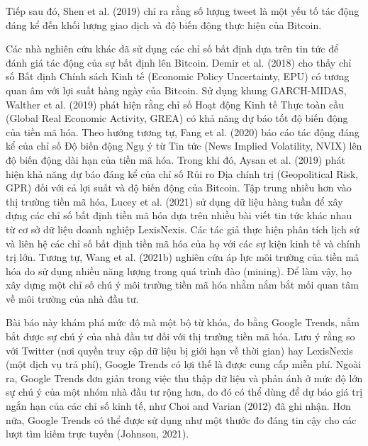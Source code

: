 Tiếp sau đó, Shen et al. (2019) chỉ ra rằng số lượng tweet là một yếu tố tác động đáng kể đến khối lượng giao dịch và độ biến động thực hiện của Bitcoin.

Các nhà nghiên cứu khác đã sử dụng các chỉ số bất định dựa trên tin tức để đánh giá tác động của sự bất định lên Bitcoin. Demir et al. (2018) cho thấy chỉ số Bất định Chính sách Kinh tế (Economic Policy Uncertainty, EPU) có tương quan âm với lợi suất hàng ngày của Bitcoin. Sử dụng khung GARCH-MIDAS, Walther et al. (2019) phát hiện rằng chỉ số Hoạt động Kinh tế Thực toàn cầu (Global Real Economic Activity, GREA) có khả năng dự báo tốt độ biến động của tiền mã hóa. Theo hướng tương tự, Fang et al. (2020) báo cáo tác động đáng kể của chỉ số Độ biến động Ngụ ý từ Tin tức (News Implied Volatility, NVIX) lên độ biến động dài hạn của tiền mã hóa. Trong khi đó, Aysan et al. (2019) phát hiện khả năng dự báo đáng kể của chỉ số Rủi ro Địa chính trị (Geopolitical Risk, GPR) đối với cả lợi suất và độ biến động của Bitcoin. Tập trung nhiều hơn vào thị trường tiền mã hóa, Lucey et al. (2021) sử dụng dữ liệu hàng tuần để xây dựng các chỉ số bất định tiền mã hóa dựa trên nhiều bài viết tin tức khác nhau từ cơ sở dữ liệu doanh nghiệp LexisNexis. Các tác giả thực hiện phân tích lịch sử và liên hệ các chỉ số bất định tiền mã hóa của họ với các sự kiện kinh tế và chính trị lớn. Tương tự, Wang et al. (2021b) nghiên cứu áp lực môi trường của tiền mã hóa do sử dụng nhiều năng lượng trong quá trình đào (mining). Để làm vậy, họ xây dựng một chỉ số chú ý môi trường tiền mã hóa nhằm nắm bắt mối quan tâm về môi trường của nhà đầu tư.

Bài báo này khám phá mức độ mà một bộ từ khóa, đo bằng Google Trends, nắm bắt được sự chú ý của nhà đầu tư đối với thị trường tiền mã hóa. Lưu ý rằng so với Twitter (nơi quyền truy cập dữ liệu bị giới hạn về thời gian) hay LexisNexis (một dịch vụ trả phí), Google Trends có lợi thế là được cung cấp miễn phí. Ngoài ra, Google Trends đơn giản trong việc thu thập dữ liệu và phản ánh ở mức độ lớn sự chú ý của một nhóm nhà đầu tư rộng hơn, do đó có thể dùng để dự báo giá trị ngắn hạn của các chỉ số kinh tế, như Choi and Varian (2012) đã ghi nhận. Hơn nữa, Google Trends có thể được sử dụng như một thước đo đáng tin cậy cho các lượt tìm kiếm trực tuyến (Johnson, 2021).

